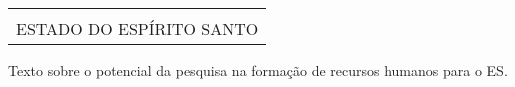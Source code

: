 \begin{longtable}[c]{l}
\hline
\rowcolor[HTML]{C0C0C0} 
\multicolumn{1}{|m{16.6cm}|}{\cellcolor[HTML]{C0C0C0}\textbf{\begin{tabular}[c]{@{}l@{}}
XIX. POTENCIAL DA PESQUISA NA FORMAÇÃO DE RECURSOS HUMANOS PARA O \\ ESTADO DO ESPÍRITO SANTO
\end{tabular}}} \\ \hline
\endfirsthead
%
\endhead
%
\end{longtable}

Texto sobre o potencial da pesquisa na formação de recursos humanos para o ES.